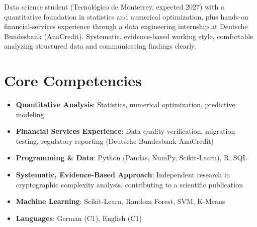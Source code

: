 \documentclass[11pt,a4paper,sans]{moderncv}
\begin{document}
\makecvtitle


\vspace{6pt}
\small{Data science student (Tecnológico de Monterrey, expected 2027) with a quantitative foundation in statistics and numerical optimization, plus hands-on financial-services experience through a data engineering internship at Deutsche Bundesbank (AnaCredit). Systematic, evidence-based working style, comfortable analyzing structured data and communicating findings clearly.}


\section{Core Competencies}
\vspace{1pt}
\begin{itemize}

\item \textbf{Quantitative Analysis}: Statistics, numerical optimization, predictive modeling

\item \textbf{Financial Services Experience}: Data quality verification, migration testing, regulatory reporting (Deutsche Bundesbank AnaCredit)

\item \textbf{Programming \& Data}: Python (Pandas, NumPy, Scikit-Learn), R, SQL

\item \textbf{Systematic, Evidence-Based Approach}: Independent research in cryptographic complexity analysis, contributing to a scientific publication

\item \textbf{Machine Learning}: Scikit-Learn, Random Forest, SVM, K-Means

\item \textbf{Languages}: German (C1), English (C1)

\end{itemize}

\end{document}
